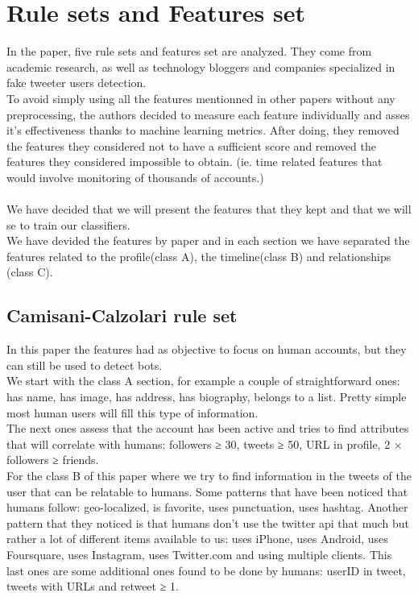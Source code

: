 \documentclass[a4paper,11pt]{article}
\begin{document}
\section{Rule sets and Features set}
In the paper, five rule sets and features set are analyzed. They come from  academic research, as well as technology bloggers and companies specialized in fake tweeter users detection.\\
To avoid simply using all the features mentionned in other papers without any preprocessing, the authors decided to measure each feature individually and asses it's effectiveness thanks to machine learning metrics. After doing, they removed the features they considered not to have a sufficient score and removed the features they considered impossible to obtain. (ie. time related features that would involve monitoring of thousands of accounts.)
\\\\
We have decided that we will present the features that they kept and that we will se to train our classifiers.\\
We have devided the features by paper and in each section we have separated the features related to the profile(class A), the timeline(class B) and relationships (class C).
\subsection{Camisani-Calzolari rule set}
In this paper the features had as objective to focus on human accounts, but they can still be used to detect bots. \\
We start with the class A section, for example a couple of straightforward ones: has name, has image, has address, has biography, belongs to a list.
Pretty simple most human users will fill this type of information.\\
The next ones assess that the account has been active and tries to find attributes that will correlate with humans: followers ≥ 30, tweets ≥ 50, URL
in profile, 2 × followers ≥ friends.\\
For the class B of this paper where we try to find information in the tweets of the user that can be relatable to humans. Some patterns that have been noticed that humans follow: geo-localized, is favorite, uses punctuation, uses hashtag. Another pattern that they noticed is that humans don't use the twitter api that much but rather a lot of different items available to us: uses iPhone, uses Android, uses Foursquare, uses Instagram, uses Twitter.com and using multiple clients. This last ones are some additional ones found to be done by humans: userID in tweet,
tweets with URLs and retweet ≥ 1. 
\end{document}
